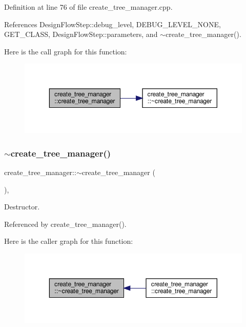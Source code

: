 Definition at line 76 of file create\+\_\+tree\+\_\+manager.\+cpp.



References Design\+Flow\+Step\+::debug\+\_\+level, D\+E\+B\+U\+G\+\_\+\+L\+E\+V\+E\+L\+\_\+\+N\+O\+NE, G\+E\+T\+\_\+\+C\+L\+A\+SS, Design\+Flow\+Step\+::parameters, and $\sim$create\+\_\+tree\+\_\+manager().

Here is the call graph for this function\+:
\nopagebreak
\begin{figure}[H]
\begin{center}
\leavevmode
\includegraphics[width=350pt]{d6/d8a/classcreate__tree__manager_a1e50044ecf7bfd389dd32e792945ea78_cgraph}
\end{center}
\end{figure}
\mbox{\label{classcreate__tree__manager_a16354da68ac6b4b1a280d153aeb916fa}} 
\subsubsection{\texorpdfstring{$\sim$create\+\_\+tree\+\_\+manager()}{~create\_tree\_manager()}}
{\footnotesize\ttfamily create\+\_\+tree\+\_\+manager\+::$\sim$create\+\_\+tree\+\_\+manager (\begin{DoxyParamCaption}{ }\end{DoxyParamCaption})\hspace{0.3cm}{\ttfamily [override]}, {\ttfamily [default]}}



Destructor. 



Referenced by create\+\_\+tree\+\_\+manager().

Here is the caller graph for this function\+:
\nopagebreak
\begin{figure}[H]
\begin{center}
\leavevmode
\includegraphics[width=350pt]{d6/d8a/classcreate__tree__manager_a16354da68ac6b4b1a280d153aeb916fa_icgraph}
\end{center}
\end{figure}



